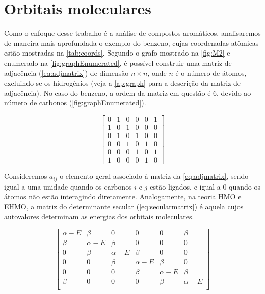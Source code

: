\newpage
\section{Orbitais moleculares}\label{sec:benzene}

Como o enfoque desse trabalho é a análise de compostos aromáticos, analisaremos de maneira mais aprofundada o exemplo do benzeno, cujas coordenadas atômicas estão mostradas na \autoref{tab:coords}. Segundo o grafo mostrado na \autoref{fig:M2} e enumerado na \autoref{fig:graphEnumerated}, é possível construir uma matriz de adjacência (\autoref{eq:adjmatrix}) de dimensão $n \times n$, onde $n$ é o número de átomos, excluindo-se os hidrogênios (veja a \autoref{ap:graph} para a descrição da matriz de adjacência). No caso do benzeno, a ordem da matriz em questão é 6, devido ao número de carbonos (\autoref{fig:graphEnumerated}).

\begin{figure}[htb]
\vspace{0.8\baselineskip}
\begin{equation}
\label{eq:adjmatrix}
\begin{bmatrix}
    0 & 1 & 0 & 0 & 0 & 1 \\
    1 & 0 & 1 & 0 & 0 & 0 \\
    0 & 1 & 0 & 1 & 0 & 0 \\
    0 & 0 & 1 & 0 & 1 & 0 \\
    0 & 0 & 0 & 1 & 0 & 1 \\
    1 & 0 & 0 & 0 & 1 & 0
\end{bmatrix}
\end{equation}
\end{figure}

 Consideremos $a_{ij}$ o elemento geral associado à matriz da \autoref{eq:adjmatrix}, sendo igual a uma unidade quando os carbonos $i$ e $j$ estão ligados, e igual a $0$ quando os átomos não estão interagindo diretamente. Analogamente, na teoria \gls{HMO} e \gls{EHMO}, a matriz do determinante secular (\autoref{eq:secularmatrix}) é aquela cujos autovalores determinam as energias dos orbitais moleculares.

\begin{figure}[htb]
\vspace{0.8\baselineskip}
\begin{equation}
\label{eq:secularmatrix}
\begin{bmatrix}
    \alpha - E & \beta & 0 & 0 & 0 & \beta \\
    \beta & \alpha - E & \beta & 0 & 0 & 0 \\
    0 & \beta & \alpha - E & \beta & 0 & 0 \\
    0 & 0 & \beta & \alpha - E & \beta & 0 \\
    0 & 0 & 0 & \beta & \alpha - E & \beta \\
    \beta & 0 & 0 & 0 & \beta & \alpha - E \\
\end{bmatrix}
\end{equation}
\end{figure}

